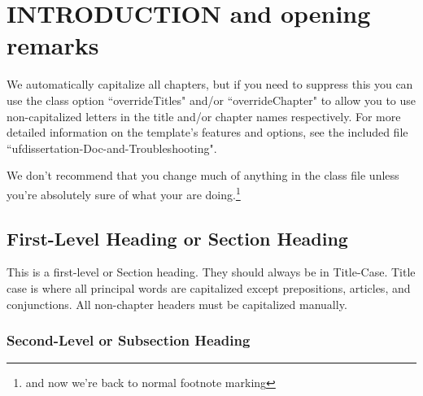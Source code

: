 \renewcommand{\thefootnote}{\fnsymbol{footnote}} %

\chapter{INTRODUCTION and opening remarks} \renewcommand{\thefootnote}{\fnsymbol{footnote}} %
\label{intro}


\renewcommand*{\thealgorithm}{\thechapter-\arabic{algorithm}} %

We automatically capitalize all chapters, but if you need to suppress this you can use the class option ``overrideTitles" and/or ``overrideChapter" to allow you to use non-capitalized letters in the title and/or chapter names respectively. For more detailed information on the template's features and options, see the included file ``ufdissertation-Doc-and-Troubleshooting".

 We don't recommend that you change much of anything in the class file unless you're absolutely sure of what your are doing.\renewcommand*{\thefootnote}{\arabic{footnote}}\setcounter{footnote}{0}\footnote{and now we're back to normal footnote marking} 

\section{First-Level Heading or Section Heading}

This is a first-level or Section heading. They should always be in Title-Case. Title case is where all principal words are capitalized except prepositions, articles, and conjunctions. All non-chapter headers must be capitalized manually.

\subsection{Second-Level or Subsection Heading}

